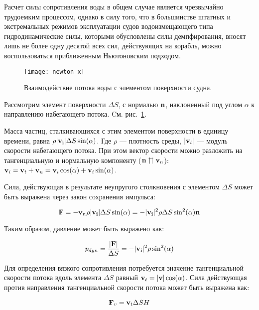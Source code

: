 Расчет силы сопротивления воды в общем случае является чрезвычайно трудоемким процессом, однако в силу того, что в большинстве штатных и экстремальных режимов эксплуатации судов водоизмещающего типа гидродинамические силы, которыми обусловлены силы демпфирования, вносят лишь не более одну десятой всех сил, действующих на корабль, можно воспользоваться приближенным Ньютоновским подходом.

\begin{figure}[ht]
\begin{center}
\texttt{[image: newton\_x]}
\end{center}
\caption{Взаимодействие потока воды с элементом поверхности судна.}
\label{newton_x}
\end{figure}

Рассмотрим элемент поверхности $\Delta S$, с нормалью $\mathbf{n}$, наклоненный под углом $\alpha$ к направлению набегающего потока. Cм. рис.~\ref{newton_x}.

Масса частиц, сталкивающихся с этим элементом поверхности в единицу времени, равна 
$\rho \lvert\mathbf{v_i}\rvert \Delta S \sin(\alpha)$. Где $\rho$ --- плотность среды, $\lvert\mathbf{v}_i\rvert$ --- модуль скорости набегающего потока. При этом вектор скорости можно разложить на тангенциальную и нормальную компоненту ($\mathbf{n} \upuparrows \mathbf{v}_n$): $\mathbf{v}_{i}=\mathbf{v}_t + \mathbf{v}_n = \mathbf{v}_{i} \cos(\alpha) + \mathbf{v}_{i} \sin(\alpha)$.

Сила, действующая в результате неупругого столкновения с элементом $\Delta S$
может быть выражена через закон сохранения импульса:

\begin{equation}
	\mathbf{F} = -\mathbf{v}_n \rho \lvert\mathbf{v_i}\rvert \Delta S \sin(\alpha)
			 = -\lvert\mathbf{v_i}\rvert^2 \rho \Delta S \sin^2(\alpha) \mathbf{n}
\end{equation}

Таким образом, давление может быть выражено как:

\begin{equation}
	p_{dyn} = \frac{\lvert\mathbf{F}\rvert}{\Delta S} = - \lvert\mathbf{v_i}\rvert^2 \rho \sin^2(\alpha)
\end{equation}

Для определения вязкого сопротивления потребуется значение тангенциальной скорости потока вдоль элемента 
$\Delta S$ равный $\mathbf{v}_t = \lvert\mathbf{v}\rvert \cos(\alpha)$. Сила действующая против направления тангенциальной скорости потока может быть выражена как:

\begin{equation}
	\mathbf{F}_v = \mathbf{v}_t \Delta S H
\end{equation}


